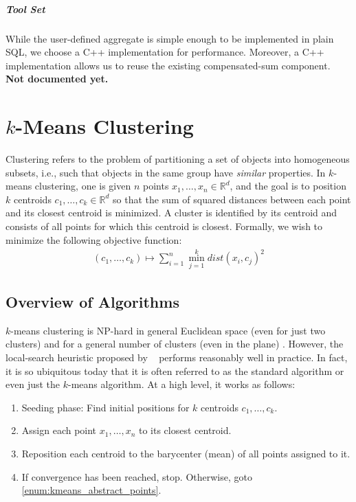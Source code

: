 \documentclass[letterpaper,11pt]{scrreprt}
\numberwithin{equation}{section}
\newcommand{\todo}[1]{\textbf{\color{red}#1}}
\newcommand{\setsymbol}[1]{\mathbb{#1}}
\newcommand{\R}{\setsymbol{R}}
\theoremstyle{algorithm}
\newcommand{\dist}{\ensuremath{\mathit{dist}}}
\begin{document}
\paragraph{Tool Set}

While the user-defined aggregate is simple enough to be implemented in plain SQL, we choose a C++ implementation for performance. Moreover, a C++ implementation allows us to reuse the existing compensated-sum component. \todo{Not documented yet.}


\chapter[k-Means Clustering]{$k$-Means Clustering}

Clustering refers to the problem of partitioning a set of objects into homogeneous subsets, i.e., such that objects in the same group have \emph{similar} properties. In $k$-means clustering,
one is given $n$ points $x_1, \dots, x_n \in \R^d$, and the goal is
to position $k$ centroids $c_1, \dots, c_k \in \R^d$ so that the sum of squared
distances between each point and its closest centroid is minimized. A cluster
is identified by its centroid and consists of all points for which this
centroid is closest. Formally, we wish to minimize the following objective
function:
\begin{gather*}
    (c_1, \dots, c_k) \mapsto \sum_{i=1}^n \min_{j=1}^k \dist(x_i, c_j)^2
\end{gather*}

\section{Overview of Algorithms} \label{sec:kmeans:Algorithms}

$k$-means clustering is NP-hard in general Euclidean space (even for just two clusters) \cite{ADH09a} and for a general number of clusters (even in the plane) \cite{MNV10a}. However, the local-search heuristic proposed by \citeauthor{L82a}~\cite{L82a} performs reasonably well in practice. In fact, it is so ubiquitous today that it is often referred to as the standard algorithm or even just the $k$-means algorithm. At a high level, it works as follows:

\begin{enumerate}
	\item Seeding phase: Find initial positions for $k$ centroids $c_1, \dots, c_k$.
	\item Assign each point $x_1, \dots, x_n$ to its closest centroid. \label{enum:kmeans_abstract_points}
	\item Reposition each centroid to the barycenter (mean) of all points assigned to it.
	\item If convergence has been reached, stop. Otherwise, goto \eqref{enum:kmeans_abstract_points}.
\end{enumerate}
\end{document}
